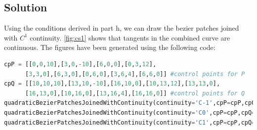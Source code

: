 \documentclass[a4paper, 11pt]{article}
\begin{document}
\begin{enumerate}
\begin{enumerate}[label=\alph*.]
    \subsection*{Solution}
    Using the conditions derived in part h, we can draw the bezier patches joined with \(C^1\) continuity. \ref{fig:cs1} shows that tangents in the combined curve are continuous. The figures have been generated using the following code:
    \begin{lstlisting}[language=Python]
cpP = [[0,0,10],[3,0,-10],[6,0,0],[0,3,12],
      [3,3,0],[6,3,0],[0,6,0],[3,6,4],[6,6,0]] #control points for P
cpQ = [[10,10,10],[13,10,-10],[16,10,0],[10,13,12],[13,13,0],
      [16,13,0],[10,16,0],[13,16,4],[16,16,0]] #control points for Q
quadraticBezierPatchesJoinedWithContinuity(continuity='C-1',cpP=cpP,cpQ=cpQ)
quadraticBezierPatchesJoinedWithContinuity(continuity='C0',cpP=cpP,cpQ=cpQ)
quadraticBezierPatchesJoinedWithContinuity(continuity='C1',cpP=cpP,cpQ=cpQ)
\end{lstlisting} 
\begin{figure}[ht] 
   \quad 
\end{figure}
\end{enumerate}
\end{enumerate}
\end{document}
